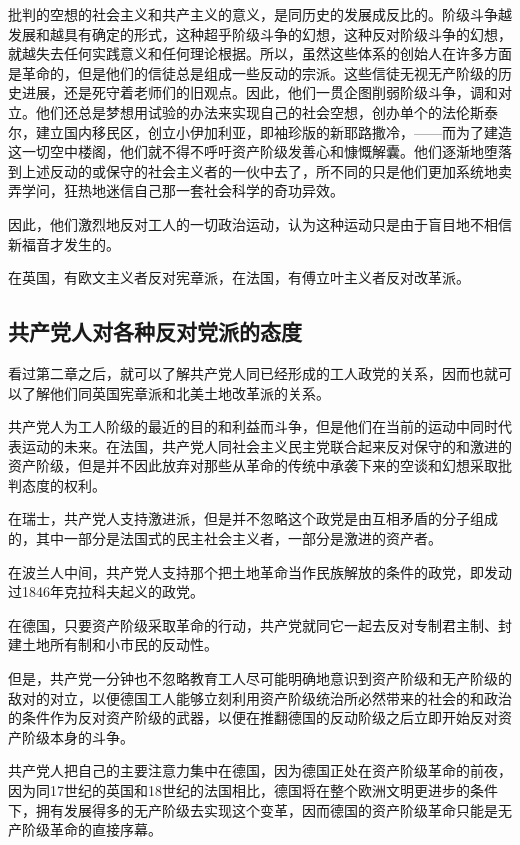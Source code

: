     批判的空想的社会主义和共产主义的意义，是同历史的发展成反比的。阶级斗争越发展和越具有确定的形式，这种超乎阶级斗争的幻想，这种反对阶级斗争的幻想，就越失去任何实践意义和任何理论根据。所以，虽然这些体系的创始人在许多方面是革命的，但是他们的信徒总是组成一些反动的宗派。这些信徒无视无产阶级的历史进展，还是死守着老师们的旧观点。因此，他们一贯企图削弱阶级斗争，调和对立。他们还总是梦想用试验的办法来实现自己的社会空想，创办单个的法伦斯泰尔，建立国内移民区，创立小伊加利亚，即袖珍版的新耶路撒冷，——而为了建造这一切空中楼阁，他们就不得不呼吁资产阶级发善心和慷慨解囊。他们逐渐地堕落到上述反动的或保守的社会主义者的一伙中去了，所不同的只是他们更加系统地卖弄学问，狂热地迷信自己那一套社会科学的奇功异效。

    因此，他们激烈地反对工人的一切政治运动，认为这种运动只是由于盲目地不相信新福音才发生的。

    在英国，有欧文主义者反对宪章派，在法国，有傅立叶主义者反对改革派。
    \subsection{共产党人对各种反对党派的态度}
    看过第二章之后，就可以了解共产党人同已经形成的工人政党的关系，因而也就可以了解他们同英国宪章派和北美土地改革派的关系。

    共产党人为工人阶级的最近的目的和利益而斗争，但是他们在当前的运动中同时代表运动的未来。在法国，共产党人同社会主义民主党联合起来反对保守的和激进的资产阶级，但是并不因此放弃对那些从革命的传统中承袭下来的空谈和幻想采取批判态度的权利。

    在瑞士，共产党人支持激进派，但是并不忽略这个政党是由互相矛盾的分子组成的，其中一部分是法国式的民主社会主义者，一部分是激进的资产者。

    在波兰人中间，共产党人支持那个把土地革命当作民族解放的条件的政党，即发动过1846年克拉科夫起义的政党。

    在德国，只要资产阶级采取革命的行动，共产党就同它一起去反对专制君主制、封建土地所有制和小市民的反动性。

    但是，共产党一分钟也不忽略教育工人尽可能明确地意识到资产阶级和无产阶级的敌对的对立，以便德国工人能够立刻利用资产阶级统治所必然带来的社会的和政治的条件作为反对资产阶级的武器，以便在推翻德国的反动阶级之后立即开始反对资产阶级本身的斗争。

    共产党人把自己的主要注意力集中在德国，因为德国正处在资产阶级革命的前夜，因为同17世纪的英国和18世纪的法国相比，德国将在整个欧洲文明更进步的条件下，拥有发展得多的无产阶级去实现这个变革，因而德国的资产阶级革命只能是无产阶级革命的直接序幕。

